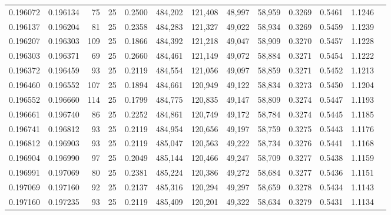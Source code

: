 \begin{tabular}{rrrrrrrrrrrrr}
0.196072 & 0.196134 &    75 &  25 &                                     0.2500 & 484,202 & 121,408 &  48,997 &  58,959 & 0.3269 & 0.5461 & 1.1246 \\
0.196137 & 0.196204 &    81 &  25 &                                     0.2358 & 484,283 & 121,327 &  49,022 &  58,934 & 0.3269 & 0.5459 & 1.1239 \\
0.196207 & 0.196303 &   109 &  25 &                                     0.1866 & 484,392 & 121,218 &  49,047 &  58,909 & 0.3270 & 0.5457 & 1.1228 \\
0.196303 & 0.196371 &    69 &  25 &                                     0.2660 & 484,461 & 121,149 &  49,072 &  58,884 & 0.3271 & 0.5454 & 1.1222 \\
0.196372 & 0.196459 &    93 &  25 &                                     0.2119 & 484,554 & 121,056 &  49,097 &  58,859 & 0.3271 & 0.5452 & 1.1213 \\
0.196460 & 0.196552 &   107 &  25 &                                     0.1894 & 484,661 & 120,949 &  49,122 &  58,834 & 0.3273 & 0.5450 & 1.1204 \\
0.196552 & 0.196660 &   114 &  25 &                                     0.1799 & 484,775 & 120,835 &  49,147 &  58,809 & 0.3274 & 0.5447 & 1.1193 \\
0.196661 & 0.196740 &    86 &  25 &                                     0.2252 & 484,861 & 120,749 &  49,172 &  58,784 & 0.3274 & 0.5445 & 1.1185 \\
0.196741 & 0.196812 &    93 &  25 &                                     0.2119 & 484,954 & 120,656 &  49,197 &  58,759 & 0.3275 & 0.5443 & 1.1176 \\
0.196812 & 0.196903 &    93 &  25 &                                     0.2119 & 485,047 & 120,563 &  49,222 &  58,734 & 0.3276 & 0.5441 & 1.1168 \\
0.196904 & 0.196990 &    97 &  25 &                                     0.2049 & 485,144 & 120,466 &  49,247 &  58,709 & 0.3277 & 0.5438 & 1.1159 \\
0.196991 & 0.197069 &    80 &  25 &                                     0.2381 & 485,224 & 120,386 &  49,272 &  58,684 & 0.3277 & 0.5436 & 1.1151 \\
0.197069 & 0.197160 &    92 &  25 &                                     0.2137 & 485,316 & 120,294 &  49,297 &  58,659 & 0.3278 & 0.5434 & 1.1143 \\
0.197160 & 0.197235 &    93 &  25 &                                     0.2119 & 485,409 & 120,201 &  49,322 &  58,634 & 0.3279 & 0.5431 & 1.1134 \\

\end{tabular}
